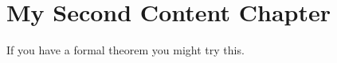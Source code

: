 \chapter{My Second Content Chapter}
\label{chapterlabel3}



If you have a formal theorem you might try this.

\blindtext
